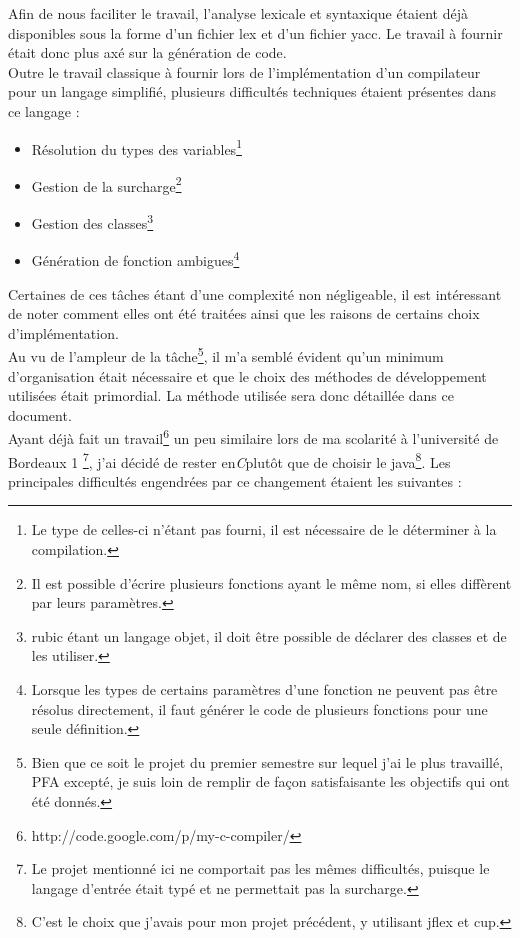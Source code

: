 \documentclass[12pt]{article}
\begin{document}
Afin de nous faciliter le travail, l'analyse lexicale et syntaxique étaient
déjà disponibles sous la forme d'un fichier lex et d'un fichier yacc. Le
travail à fournir était donc plus axé sur la génération de code.\\

Outre le travail classique à fournir lors de l'implémentation d'un
compilateur pour un langage simplifié, plusieurs difficultés techniques
étaient présentes dans ce langage :

\begin{itemize}
\item Résolution du types des variables\footnote{Le type de celles-ci
  n'étant pas fourni, il est nécessaire de le déterminer à la compilation.}
\item Gestion de la surcharge\footnote{Il est possible d'écrire plusieurs
  fonctions ayant le même nom, si elles diffèrent par leurs paramètres.}
\item Gestion des classes\footnote{rubic étant un langage objet,
  il doit être possible de déclarer des classes et de les utiliser.}
\item Génération de fonction ambigues\footnote{Lorsque les types de certains
  paramètres d'une fonction ne peuvent pas être résolus directement, il faut
  générer le code de plusieurs fonctions pour une seule définition.}
\end{itemize}

Certaines de ces tâches étant d'une complexité non négligeable, il est
intéressant de noter comment elles ont été traitées ainsi que les raisons
de certains choix d'implémentation.\\

Au vu de l'ampleur de la tâche\footnote{Bien que ce soit le projet du premier
semestre sur lequel j'ai le plus travaillé, PFA excepté, je suis loin de
remplir de façon satisfaisante les objectifs qui ont été donnés.}, il m'a
semblé évident qu'un minimum d'organisation était nécessaire et que le choix
des méthodes de développement utilisées était primordial. La méthode utilisée
sera donc détaillée dans ce document.\\

Ayant déjà fait un travail\footnote{http://code.google.com/p/my-c-compiler/}
un peu similaire lors de ma scolarité à l'université de Bordeaux 1
\footnote{Le projet mentionné ici ne comportait pas les mêmes difficultés,
puisque le langage d'entrée était typé et ne permettait pas la surcharge.},
j'ai décidé de rester en{\em C}plutôt que de choisir le java\footnote{C'est le
choix que j'avais pour mon projet précédent, y utilisant jflex et cup.}. Les
principales difficultés engendrées par ce changement étaient les suivantes :
\end{document}

